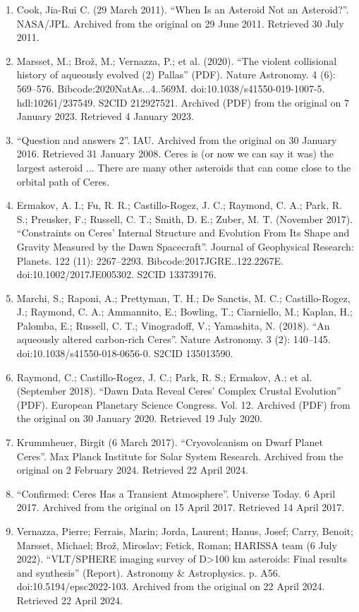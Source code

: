 \begin{enumerate}
\item Cook, Jia-Rui C. (29 March 2011). ``When Is an Asteroid Not an Asteroid?''. NASA/JPL. Archived from the original on 29 June 2011. Retrieved 30 July 2011.
\item Marsset, M.; Brož, M.; Vernazza, P.; et al. (2020). ``The violent collisional history of aqueously evolved (2) Pallas'' (PDF). Nature Astronomy. 4 (6): 569–576. Bibcode:2020NatAs...4..569M. doi:10.1038/s41550-019-1007-5. hdl:10261/237549. S2CID 212927521. Archived (PDF) from the original on 7 January 2023. Retrieved 4 January 2023.
\item ``Question and answers 2''. IAU. Archived from the original on 30 January 2016. Retrieved 31 January 2008. Ceres is (or now we can say it was) the largest asteroid ... There are many other asteroids that can come close to the orbital path of Ceres.
\item Ermakov, A. I.; Fu, R. R.; Castillo-Rogez, J. C.; Raymond, C. A.; Park, R. S.; Preusker, F.; Russell, C. T.; Smith, D. E.; Zuber, M. T. (November 2017). ``Constraints on Ceres' Internal Structure and Evolution From Its Shape and Gravity Measured by the Dawn Spacecraft''. Journal of Geophysical Research: Planets. 122 (11): 2267–2293. Bibcode:2017JGRE..122.2267E. doi:10.1002/2017JE005302. S2CID 133739176.
\item Marchi, S.; Raponi, A.; Prettyman, T. H.; De Sanctis, M. C.; Castillo-Rogez, J.; Raymond, C. A.; Ammannito, E.; Bowling, T.; Ciarniello, M.; Kaplan, H.; Palomba, E.; Russell, C. T.; Vinogradoff, V.; Yamashita, N. (2018). ``An aqueously altered carbon-rich Ceres''. Nature Astronomy. 3 (2): 140–145. doi:10.1038/s41550-018-0656-0. S2CID 135013590.
\item Raymond, C.; Castillo-Rogez, J. C.; Park, R. S.; Ermakov, A.; et al. (September 2018). ``Dawn Data Reveal Ceres' Complex Crustal Evolution'' (PDF). European Planetary Science Congress. Vol. 12. Archived (PDF) from the original on 30 January 2020. Retrieved 19 July 2020.
\item Krummheuer, Birgit (6 March 2017). ``Cryovolcanism on Dwarf Planet Ceres''. Max Planck Institute for Solar System Research. Archived from the original on 2 February 2024. Retrieved 22 April 2024.
\item ``Confirmed: Ceres Has a Transient Atmosphere''. Universe Today. 6 April 2017. Archived from the original on 15 April 2017. Retrieved 14 April 2017.
\item Vernazza, Pierre; Ferrais, Marin; Jorda, Laurent; Hanus, Josef; Carry, Benoit; Marsset, Michael; Brož, Miroslav; Fetick, Roman; HARISSA team (6 July 2022). ``VLT/SPHERE imaging survey of D>100 km asteroids: Final results and synthesis'' (Report). Astronomy \& Astrophysics. p. A56. doi:10.5194/epsc2022-103. Archived from the original on 22 April 2024. Retrieved 22 April 2024.

\end{enumerate}
